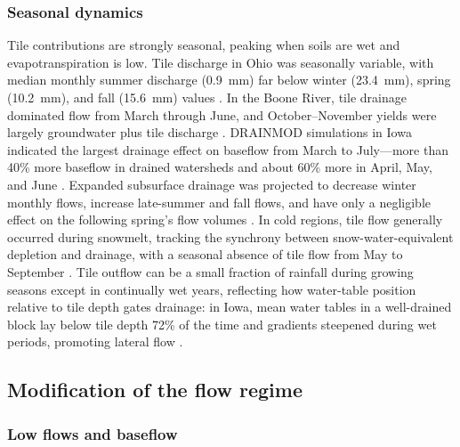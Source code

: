 \documentclass[11pt]{article}
\begin{document}
\subsubsection{Seasonal dynamics}

Tile contributions are strongly seasonal, peaking when soils are wet and evapotranspiration is low. Tile discharge in Ohio was seasonally variable, with median monthly summer discharge (0.9~mm) far below winter (23.4~mm), spring (10.2~mm), and fall (15.6~mm) values \parencite{King2014}. In the Boone River, tile drainage dominated flow from March through June, and October--November yields were largely groundwater plus tile discharge \parencite{Schilling2019}. DRAINMOD simulations in Iowa indicated the largest drainage effect on baseflow from March to July---more than 40\% more baseflow in drained watersheds and about 60\% more in April, May, and June \parencite{Schilling2008}. Expanded subsurface drainage was projected to decrease winter monthly flows, increase late-summer and fall flows, and have only a negligible effect on the following spring's flow volumes \parencite{Rahman2014}. In cold regions, tile flow generally occurred during snowmelt, tracking the synchrony between snow-water-equivalent depletion and drainage, with a seasonal absence of tile flow from May to September \parencite{Kompanizare2024}. Tile outflow can be a small fraction of rainfall during growing seasons except in continually wet years, reflecting how water-table position relative to tile depth gates drainage: in Iowa, mean water tables in a well-drained block lay below tile depth 72\% of the time and gradients steepened during wet periods, promoting lateral flow \parencite{Logsdon2020}.

\subsection{Modification of the flow regime}

\subsubsection{Low flows and baseflow}
\end{document}

